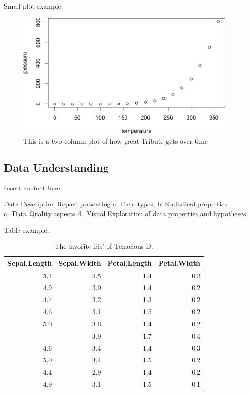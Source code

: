 \documentclass[sigchi]{acmart}
\begin{document}
Small plot example.

\begin{figure}
\includegraphics[width=0.98\textwidth]{step6_files/figure-latex/two-col-tribute-plot-1} \caption{This is a two-column plot of how great Tribute gets over time}\label{fig:two-col-tribute-plot}
\end{figure}

\hypertarget{data-understanding}{%
\subsection{Data Understanding}\label{data-understanding}}

Insert content here.

Data Description Report presenting
a. Data types,
b. Statistical properties
c.~Data Quality aspects
d.~Visual Exploration of data properties and hypotheses

Table example.

\begin{table}

\caption{\label{tab:table-iris}The favorite iris' of Tenacious D.}
\centering
\begin{tabular}[t]{rrrr}
\toprule
Sepal.Length & Sepal.Width & Petal.Length & Petal.Width\\
\midrule
5.1 & 3.5 & 1.4 & 0.2\\
4.9 & 3.0 & 1.4 & 0.2\\
4.7 & 3.2 & 1.3 & 0.2\\
4.6 & 3.1 & 1.5 & 0.2\\
5.0 & 3.6 & 1.4 & 0.2\\
\addlinespace
5.4 & 3.9 & 1.7 & 0.4\\
4.6 & 3.4 & 1.4 & 0.3\\
5.0 & 3.4 & 1.5 & 0.2\\
4.4 & 2.9 & 1.4 & 0.2\\
4.9 & 3.1 & 1.5 & 0.1\\
\bottomrule
\end{tabular}
\end{table}
\end{document}
